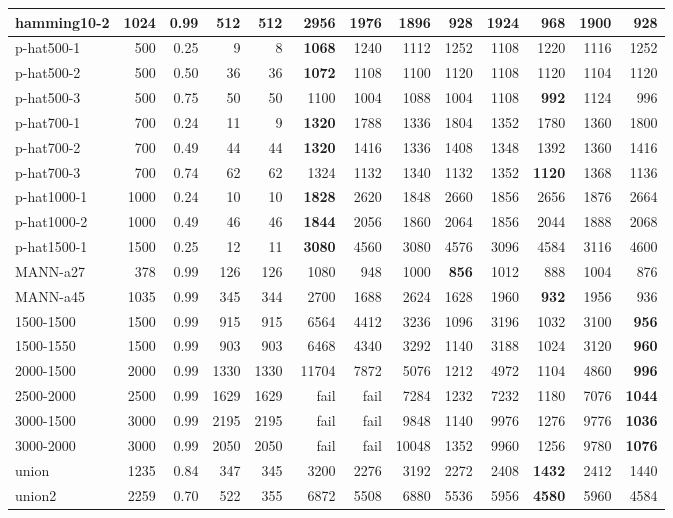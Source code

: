\begin{table}
{\begin{tabular}{|l|r|r|r|r|r|r|r|r||r|r|r|r|}
    hamming10-2 & 1024&0.99 & 512 & 512 & 2956 & 1976 & 1896 & \textbf{928} & 1924 & 968 & 1900 & \textbf{928} \\ \hline
    p-hat500-1 & 500 &0.25 &9 & 8 & \textbf{1068} & 1240 & 1112 & 1252 & 1108 & 1220 & 1116 & 1252 \\ \hline
    p-hat500-2 & 500 &0.50 &36 & 36 & \textbf{1072} & 1108 & 1100 & 1120 & 1108 & 1120 & 1104 & 1120 \\ \hline
    p-hat500-3 & 500 &0.75 &50 & 50 & 1100 & 1004 & 1088 & 1004 & 1108 & \textbf{992} & 1124 & 996 \\ \hline
    p-hat700-1 & 700 &0.24 &11 & 9 & \textbf{1320} & 1788 & 1336 & 1804 & 1352 & 1780 & 1360 & 1800 \\ \hline
    p-hat700-2 & 700 &0.49 &44 & 44 &  \textbf{1320} & 1416 & 1336 & 1408 & 1348 & 1392 & 1360 & 1416 \\ \hline
    p-hat700-3 & 700 &0.74 &62 & 62 &  1324 & 1132 & 1340 & 1132 & 1352 & \textbf{1120} & 1368 & 1136 \\ \hline
    p-hat1000-1 & 1000 &0.24 &10 & 10 & \textbf{1828} & 2620 & 1848 & 2660 & 1856 & 2656 & 1876 & 2664 \\ \hline
    p-hat1000-2 & 1000 &0.49 &46 & 46 & \textbf{1844} & 2056 & 1860 & 2064 & 1856 & 2044 & 1888 & 2068 \\ \hline
    p-hat1500-1 & 1500 &0.25 &12 & 11 & \textbf{3080} & 4560 & 3080 & 4576 & 3096 & 4584 & 3116 & 4600 \\ \hline
    MANN-a27 & 378 &0.99 &126 & 126 & 1080 & 948 & 1000 & \textbf{856} & 1012 & 888 & 1004 & 876 \\ \hline
    MANN-a45 & 1035 &0.99 &345 & 344 & 2700 & 1688 & 2624 & 1628 & 1960 & \textbf{932} & 1956 & 936 \\ \hline
    \hline
    1500-1500 & 1500 &0.99  &915 & 915 & 6564 & 4412 & 3236 & 1096 & 3196 & 1032 & 3100 & \textbf{956} \\ \hline
    1500-1550 & 1500 &0.99 &903 & 903 & 6468 & 4340 & 3292 & 1140 & 3188 & 1024 & 3120 & \textbf{960}\\ \hline
    2000-1500 & 2000 &0.99 &1330 & 1330 & 11704 & 7872 & 5076 & 1212 & 4972 & 1104 & 4860 & \textbf{996} \\ \hline
    2500-2000 & 2500 &0.99 &1629 & 1629 & fail & fail & 7284 & 1232 & 7232 & 1180 & 7076 & \textbf{1044} \\ \hline
    3000-1500 & 3000 &0.99 &2195 & 2195 & fail & fail & 9848 & 1140 & 9976 & 1276 & 9776 & \textbf{1036} \\ \hline
    3000-2000 & 3000 &0.99 &2050 & 2050 & fail & fail & 10048 & 1352 & 9960 & 1256 & 9780 & \textbf{1076} \\ \hline
    \hline
    union & 1235 & 0.84 &347 & 345 & 3200 & 2276 & 3192 & 2272 & 2408 & \textbf{1432} & 2412 & 1440 \\ \hline
    union2 & 2259 &0.70  &522 & 355 & 6872 & 5508 & 6880 & 5536 & 5956 & \textbf{4580} & 5960 & 4584 \\ \hline


\end{tabular}}
\end{table}
